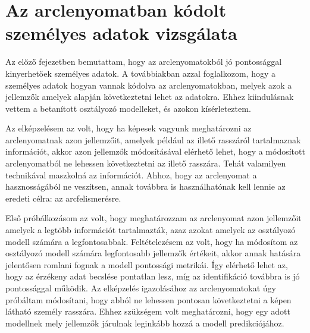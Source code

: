 \section{Az arclenyomatban kódolt személyes adatok vizsgálata} %
\label{sec:5}


Az előző fejezetben bemutattam, hogy az arclenyomatokból jó pontossággal kinyerhetőek személyes adatok. A továbbiakban azzal foglalkozom, hogy a személyes adatok hogyan vannak kódolva az arclenyomatokban, melyek azok a jellemzők amelyek alapján következtetni lehet az adatokra. Ehhez kiindulásnak vettem a betanított osztályozó modelleket, és azokon kísérleteztem.

Az elképzelésem az volt, hogy ha képesek vagyunk meghatározni az arclenyomatnak azon jellemzőit, amelyek például az illető rasszáról tartalmaznak információt, akkor azon jellemzők módosításával elérhető lehet, hogy a módosított arclenyomatból ne lehessen következtetni az illető rasszára. Tehát valamilyen technikával maszkolná az információt. Ahhoz, hogy az arclenyomat a hasznosságából ne veszítsen, annak továbbra is használhatónak kell lennie az eredeti célra: az arcfelismerésre.

Első próbálkozásom az volt, hogy meghatározzam az arclenyomat azon jellemzőit amelyek a legtöbb információt tartalmazták, azaz azokat amelyek az osztályozó modell számára a legfontosabbak. Feltételezésem az volt, hogy ha módosítom az osztályozó modell számára legfontosabb jellemzők értékeit, akkor annak hatására jelentősen romlani fognak a modell pontossági metrikái. Így elérhető lehet az, hogy az érzékeny adat becslése pontatlan lesz, míg az identifikáció továbbra is jó pontossággal működik. Az elképzelés igazolásához az arclenyomatokat úgy próbáltam módosítani, hogy abból ne lehessen pontosan következtetni a képen látható személy rasszára. Ehhez szükségem volt meghatározni, hogy egy adott modellnek mely jellemzők járulnak leginkább hozzá a modell predikciójához.

